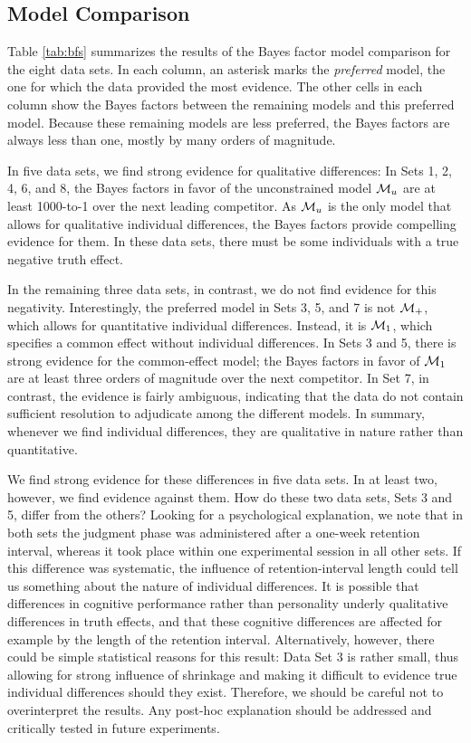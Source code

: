 \documentclass[
  english,
  ,man,floatsintext]{apa6}
\begin{document}
\hypertarget{model-comparison-1}{%
\subsection{Model Comparison}\label{model-comparison-1}}

Table \ref{tab:bfs} summarizes the results of the Bayes factor model comparison for the eight data sets. In each column, an asterisk marks the \emph{preferred} model, the one for which the data provided the most evidence. The other cells in each column show the Bayes factors between the remaining models and this preferred model. Because these remaining models are less preferred, the Bayes factors are always less than one, mostly by many orders of magnitude.

In five data sets, we find strong evidence for qualitative differences: In Sets 1, 2, 4, 6, and 8, the Bayes factors in favor of the unconstrained model \({\cal M}_u\) are at least 1000-to-1 over the next leading competitor. As \({\cal M}_u\) is the only model that allows for qualitative individual differences, the Bayes factors provide compelling evidence for them. In these data sets, there must be some individuals with a true negative truth effect.

In the remaining three data sets, in contrast, we do not find evidence for this negativity. Interestingly, the preferred model in Sets 3, 5, and 7 is not \({\cal M}_+\), which allows for quantitative individual differences. Instead, it is \({\cal M}_1\), which specifies a common effect without individual differences. In Sets 3 and 5, there is strong evidence for the common-effect model; the Bayes factors in favor of \({\cal M}_1\) are at least three orders of magnitude over the next competitor. In Set 7, in contrast, the evidence is fairly ambiguous, indicating that the data do not contain sufficient resolution to adjudicate among the different models. In summary, whenever we find individual differences, they are qualitative in nature rather than quantitative.

We find strong evidence for these differences in five data sets. In at least two, however, we find evidence against them. How do these two data sets, Sets 3 and 5, differ from the others? Looking for a psychological explanation, we note that in both sets the judgment phase was administered after a one-week retention interval, whereas it took place within one experimental session in all other sets. If this difference was systematic, the influence of retention-interval length could tell us something about the nature of individual differences. It is possible that differences in cognitive performance \autocite[e.g., source recollection;][]{begg1992} rather than personality underly qualitative differences in truth effects, and that these cognitive differences are affected for example by the length of the retention interval. Alternatively, however, there could be simple statistical reasons for this result: Data Set 3 is rather small, thus allowing for strong influence of shrinkage and making it difficult to evidence true individual differences should they exist. Therefore, we should be careful not to overinterpret the results. Any post-hoc explanation should be addressed and critically tested in future experiments.
\end{document}
